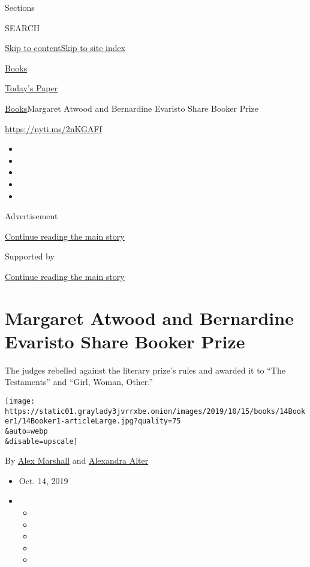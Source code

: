 Sections

SEARCH

\protect\hyperlink{site-content}{Skip to
content}\protect\hyperlink{site-index}{Skip to site index}

\href{https://www.nytimes3xbfgragh.onion/section/books}{Books}

\href{https://myaccount.nytimes3xbfgragh.onion/auth/login?response_type=cookie\&client_id=vi}{}

\href{https://www.nytimes3xbfgragh.onion/section/todayspaper}{Today's
Paper}

\href{/section/books}{Books}\textbar{}Margaret Atwood and Bernardine
Evaristo Share Booker Prize

\url{https://nyti.ms/2nKGAFf}

\begin{itemize}
\item
\item
\item
\item
\item
\end{itemize}

Advertisement

\protect\hyperlink{after-top}{Continue reading the main story}

Supported by

\protect\hyperlink{after-sponsor}{Continue reading the main story}

\hypertarget{margaret-atwood-and-bernardine-evaristo-share-booker-prize}{%
\section{Margaret Atwood and Bernardine Evaristo Share Booker
Prize}\label{margaret-atwood-and-bernardine-evaristo-share-booker-prize}}

The judges rebelled against the literary prize's rules and awarded it to
``The Testaments'' and ``Girl, Woman, Other.''

\texttt{[image: https://static01.graylady3jvrrxbe.onion/images/2019/10/15/books/14Booker1/14Booker1-articleLarge.jpg?quality=75\\\&auto=webp\\\&disable=upscale]}

By \href{https://www.nytimes3xbfgragh.onion/by/alex-marshall}{Alex
Marshall} and
\href{https://www.nytimes3xbfgragh.onion/by/alexandra-alter}{Alexandra
Alter}

\begin{itemize}
\item
  Oct. 14, 2019
\item
  \begin{itemize}
  \item
  \item
  \item
  \item
  \item
  \end{itemize}
\end{itemize}

